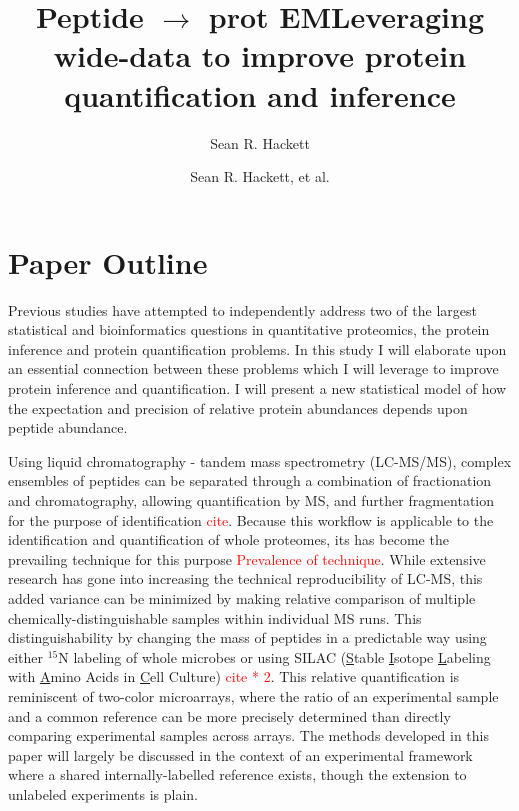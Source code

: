 \documentclass[12pt]{article}
\author{Sean R. Hackett}
\title{Peptide $\rightarrow$ prot EM}
\date{}
\begin{document}
\setlength{\parskip}{2mm}
\linespread{1}

\thispagestyle{empty}
\pagestyle{empty}

\title{Leveraging wide-data to improve protein quantification and
inference}
\author{Sean R. Hackett, et al.}


\maketitle


\section*{Paper Outline}

Previous studies have attempted to independently address two of the largest statistical and bioinformatics questions in quantitative proteomics, the protein inference and protein quantification problems. In this study I will elaborate upon an essential connection between these problems which I will leverage to improve protein inference and quantification. I will present a new statistical model of how the expectation and precision of relative protein abundances depends upon peptide abundance.

Using liquid chromatography - tandem mass spectrometry (LC-MS/MS), complex ensembles of peptides can be separated through a combination of fractionation and chromatography, allowing quantification by MS, and further fragmentation for the purpose of identification \textcolor{red}{cite}. Because this workflow is applicable to the identification and quantification of whole proteomes, its has become the prevailing technique for this purpose \textcolor{red}{Prevalence of technique}. While extensive research has gone into increasing the technical reproducibility of LC-MS, this added variance can be minimized by making relative comparison of multiple chemically-distinguishable samples within individual MS runs. This distinguishability by changing the mass of peptides in a predictable way using either $^{15}$N labeling of whole microbes or using SILAC (\underline{S}table \underline{I}sotope \underline{L}abeling with \underline{A}mino Acids in \underline{C}ell Culture) \textcolor{red}{cite * 2}. This relative quantification is reminiscent of two-color microarrays, where the ratio of an experimental sample and a common reference can be more precisely determined than directly comparing experimental samples across arrays. The methods developed in this paper will largely be discussed in the context of an experimental framework where a shared internally-labelled reference exists, though the extension to unlabeled experiments is plain.
\end{document}
